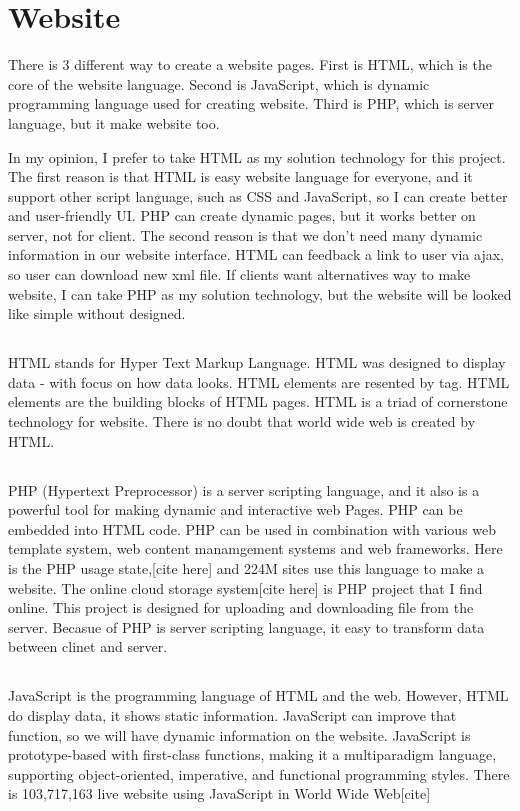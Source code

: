 \section{Website}
There is 3 different way to create a website pages. First is HTML, which is the core of the website language. Second is JavaScript, which is dynamic programming language used for creating website. Third is PHP, which is server language, but it make website too.

In my opinion, I prefer to take HTML as my solution technology for this project. The first reason is that HTML is easy website language for everyone, and it support other script language, such as CSS and JavaScript, so I can create better and user-friendly UI. PHP can create dynamic pages, but it works better on server, not for client. The second reason is that we don't need many dynamic information in our website interface. HTML can feedback a link to user via ajax, so user can download new xml file.
If clients want alternatives way to make website, I can take PHP as my solution technology, but the website will be looked like simple without designed.

\subsection{}
HTML stands for Hyper Text Markup Language. HTML was designed to display data - with focus on how data looks. HTML elements are resented by tag. HTML elements are the building blocks of HTML pages. HTML is a triad of cornerstone technology for website. There is no doubt that world wide web is created by HTML.

\subsection{}
PHP (Hypertext Preprocessor) is a server scripting language, and it also is a powerful tool for making dynamic and interactive web Pages. PHP can be embedded into HTML code. PHP can be used in combination with various web template system, web content manamgement systems and web frameworks. Here is the PHP usage state,[cite here] and 224M sites use this language to make a website. The online cloud storage system[cite here] is PHP project that I find online. This project is designed for uploading and downloading file from the server. Becasue of PHP is server scripting language, it easy to transform data between clinet and server.

\subsection{}
JavaScript is the programming language of HTML and the web. However, HTML do display data, it shows static information. JavaScript can improve that function, so we will have dynamic information on the website. JavaScript is prototype-based with first-class functions, making it a multiparadigm language, supporting object-oriented, imperative, and functional programming styles. There is 103,717,163 live website using JavaScript in World Wide Web[cite] 